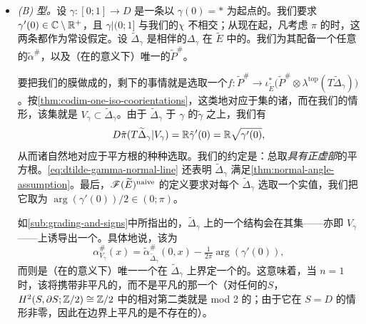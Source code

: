\begin{itemize}
\item \emph{(B) 型。}设 $\gamma\colon[0;1]\to D$ 是一条以 $\gamma(0)=*$ 为起点的\trVanishingPath。我们要求 $\gamma'(0)\in\mathbb{C}\setminus\mathbb{R}^+$，且 $\gamma|(0;1]$ 与我们的\trBasePath{}$\chi$ 不相交；从现在起，凡考虑 $\pi$ 的\trVanishingPath{}时，这两条都作为常设假定。设 $\widetilde{\Delta}_\gamma$ 是相伴的\trLefschetzThimble{}$\Delta_\gamma$ 在 $\widetilde{E}$ 中的\trPreimage。我们为其配备一个任意的\trGrading{}$\tilde{\alpha}^{\#}$，以及（在\trIsomorphic{}的意义下）唯一的\trPinStructure{}$\widetilde{P}^{\#}$。

要把我们的膜做成\trEquivariant{}的，剩下的事情就是选取一个\trIsomorphism{}$f\colon\widetilde{P}^{\#}\to\iota_{\widetilde{E}}^*\bigl(\widetilde{P}^{\#}\otimes\lambda^{\mathrm{top}}(T\widetilde{\Delta}_\gamma)\bigr)$。按\cref{thm:codim-one-iso-coorientations}，这类\trIsomorphism{}\trCanonical{}地对应于\trFixedPoint{}集的诸\trCoorientation，而在我们的情形，该\trFixedPoint{}集就是 $V_\gamma\subset\widetilde{\Delta}_\gamma$。由于 $\widetilde{\Delta}_\gamma$ \trFibration{}于 $\gamma$ 的\trPreimage{}$\tilde{\gamma}$ 之上，我们有
\begin{equation}\label{eq:dtilde-gamma-normal-line}
D\tilde{\pi}(T\widetilde{\Delta}_\gamma|V_\gamma)=\mathbb{R}\tilde{\gamma}'(0)=\mathbb{R}\sqrt{\gamma'(0)},
\end{equation}
从而诸\trCoorientation{}自然地对应于平方根的种种选取。我们的约定是：总取\emph{具有正虚部}的平方根。\eqref{eq:dtilde-gamma-normal-line} 还表明 $\widetilde{\Delta}_\gamma$ 满足\cref{thm:normal-angle-assumption}。最后，$\mathscr{F}(\widetilde{E})^{\mathrm{naive}}$ 的定义要求对每个 $\widetilde{\Delta}_\gamma$ 选取一个实值\trNormalAngle，我们把它取为 $\arg(\gamma'(0))/2\in(0;\pi)$。

如\cref{sub:grading-and-signs}中所指出的，$\widetilde{\Delta}_\gamma$ 上的一个\trEquivariant{}\trBrane{}结构会在其\trFixedPoint{}集——亦即 $V_\gamma$——上诱导出一个\trBraneStructure。具体地说，该\trGrading{}为
\begin{equation*}
\alpha^{\#}_{V_\gamma}(x)=\tilde{\alpha}^{\#}_{\widetilde{\Delta}_\gamma}(0,x)-\tfrac{1}{2\pi}\arg(\gamma'(0)),
\end{equation*}
而\trPinStructure{}则是（在\trIsomorphic{}的意义下）唯一一个在 $\widetilde{\Delta}_\gamma$ 上界定一个\trPinStructure{}的。这意味着，当 $n=1$ 时，该\trVanishingCycle{}将携带非平凡的\trPinStructure，而不是平凡的那一个（对任何\trCompact\trConnected{}的\trSurface{}$S$，$H^2(S,\partial S;\mathbb{Z}/2)\cong\mathbb{Z}/2$ 中的相对第二\trStiefelWhitney{}类就是 mod 2 的\trEulerCharacteristic；由于它在 $S=D$ 的情形非零，因此在边界上平凡的\trPinStructure{}是不存在的）。
\end{itemize}
